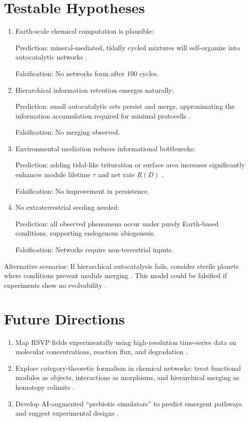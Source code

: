 \documentclass{book}
\begin{document}
\section{Testable Hypotheses}
\begin{enumerate}
\item Earth-scale chemical computation is plausible:

Prediction: mineral-mediated, tidally cycled mixtures will self-organize into autocatalytic networks \citep{plum2025}.

Falsification: No networks form after 100 cycles.

\item Hierarchical information retention emerges naturally:

Prediction: small autocatalytic sets persist and merge, approximating the information accumulation required for minimal protocells \citep{sokolskyi2024}.

Falsification: No merging observed.

\item Environmental mediation reduces informational bottlenecks:

Prediction: adding tidal-like trituration or surface area increases significantly enhances module lifetime $\tau$ and net rate $R(D)$ \citep{matreux2024}.

Falsification: No improvement in persistence.

\item No extraterrestrial seeding needed:

Prediction: all observed phenomena occur under purely Earth-based conditions, supporting endogenous abiogenesis.

Falsification: Networks require non-terrestrial inputs.
\end{enumerate}

Alternative scenarios: If hierarchical autocatalysis fails, consider sterile planets where conditions prevent module merging \citep{martin2015}. This model could be falsified if experiments show no evolvability \citep{vasas2010}.

\section{Future Directions}
\begin{enumerate}
\item Map RSVP fields experimentally using high-resolution time-series data on molecular concentrations, reaction flux, and degradation \citep{sokolskyi2024}.
\item Explore category-theoretic formalism in chemical networks: treat functional modules as objects, interactions as morphisms, and hierarchical merging as homotopy colimits \citep{steel2013}.
\item Develop AI-augmented “prebiotic simulators” to predict emergent pathways and suggest experimental designs \citep{scalinghypothesis}.
\end{enumerate}
\end{document}
